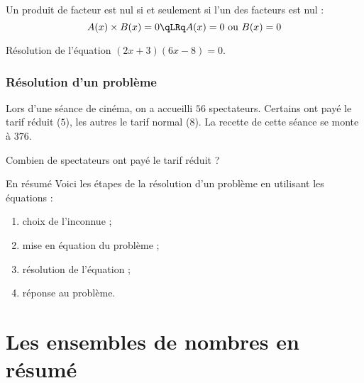 \documentclass[xcolor={dvipsnames,svgnames,table}]{beamer}
\begin{document}
\begin{frame}
    \begin{Prop}[admise]
        Un produit de facteur est nul si et seulement si l'un des facteurs est nul :
        \[A(x) \times B(x) = 0 \qLRq A(x) = 0 \text{ ou } B(x) = 0\]
    \end{Prop}
\end{frame}

\begin{frame}
    \begin{Example}
       Résolution de l'équation $(2x + 3)(6x - 8) = 0$.\par
       \rule{0pt}{5cm}
    \end{Example}
\end{frame}

\subsubsection{Résolution d'un problème}

\begin{frame}
    \begin{Example}
        Lors d'une séance de cinéma, on a accueilli $56$ spectateurs. Certains ont payé le tarif réduit ($5$\EUR), les autres le tarif normal ($8$\EUR). La recette de cette séance se monte à $376$\EUR.\par Combien de spectateurs ont payé le tarif réduit ?
        
        \rule{0pt}{4cm}
    \end{Example}
\end{frame}

\begin{frame}{En résumé}
    Voici les étapes de la résolution d'un problème en utilisant les équations :\pause
    \begin{enumerate}
        \item choix de l'inconnue ;\pause
        \item mise en équation du problème ;\pause
        \item résolution de l'équation ;\pause
        \item réponse au problème.
    \end{enumerate}
\end{frame}

\section{Les ensembles de nombres en résumé}
\end{document}
